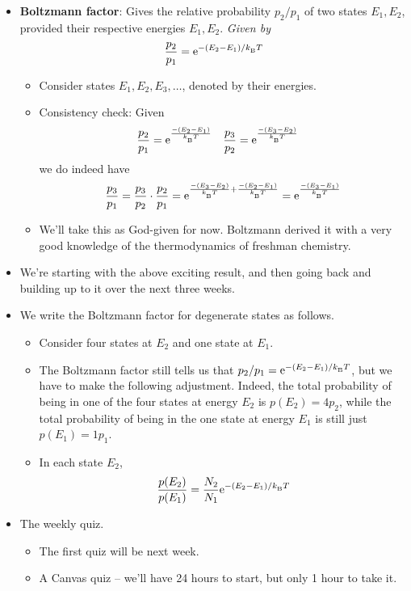 \documentclass[../notes.tex]{subfiles}
\begin{document}
\begin{itemize}
\begin{itemize}
\begin{itemize}
        \end{itemize}
    \end{itemize}
    \item \textbf{Boltzmann factor}: Gives the relative probability $p_2/p_1$ of two states $E_1,E_2$, provided their respective energies $E_1,E_2$. \emph{Given by}
    \begin{equation*}
        \frac{p_2}{p_1} = \e[-(E_2-E_1)/\kB T]
    \end{equation*}
    \begin{itemize}
        \item Consider states $E_1,E_2,E_3,\dots$, denoted by their energies.
        \item Consistency check: Given
        \begin{align*}
            \frac{p_2}{p_1} &= \e[\frac{-(E_2-E_1)}{\kB T}]&
            \frac{p_3}{p_2} &= \e[\frac{-(E_3-E_2)}{\kB T}]
        \end{align*}
        we do indeed have
        \begin{equation*}
            \frac{p_3}{p_1} = \frac{p_3}{p_2}\cdot\frac{p_2}{p_1}
            = \e[\frac{-(E_3-E_2)}{\kB T}+\frac{-(E_2-E_1)}{\kB T}]
            = \e[\frac{-(E_3-E_1)}{\kB T}]
        \end{equation*}
        \item We'll take this as God-given for now. Boltzmann derived it with a very good knowledge of the thermodynamics of freshman chemistry.
    \end{itemize}
    \item We're starting with the above exciting result, and then going back and building up to it over the next three weeks.
    \item We write the Boltzmann factor for degenerate states as follows.
    \begin{itemize}
        \item Consider four states at $E_2$ and one state at $E_1$.
        \item The Boltzmann factor still tells us that $p_2/p_1=\e[-(E_2-E_1)/\kB T]$, but we have to make the following adjustment. Indeed, the total probability of being in one of the four states at energy $E_2$ is $p(E_2)=4p_2$, while the total probability of being in the one state at energy $E_1$ is still just $p(E_1)=1p_1$.
        \item In each state $E_2$,
        \begin{equation*}
            \frac{p(E_2)}{p(E_1)} = \frac{N_2}{N_1}\e[-(E_2-E_1)/\kB T]
        \end{equation*}
    \end{itemize}
    \item The weekly quiz.
    \begin{itemize}
        \item The first quiz will be next week.
        \item A Canvas quiz -- we'll have 24 hours to start, but only 1 hour to take it.
    \end{itemize}
\end{itemize}
\end{document}
